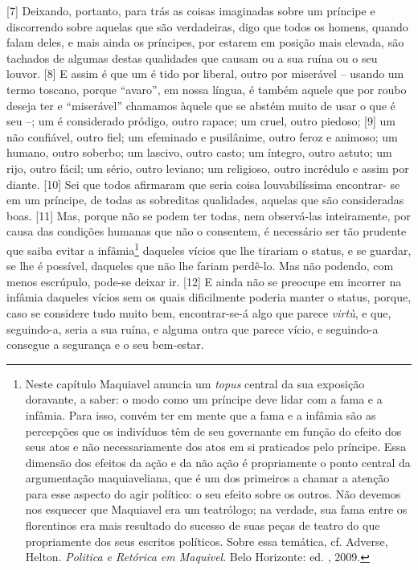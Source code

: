 {[}7{]} Deixando, portanto, para trás as coisas imaginadas sobre um
príncipe e discorrendo sobre aquelas que são verdadeiras, digo que todos
os homens, quando falam deles, e mais ainda os príncipes, por estarem em
posição mais elevada, são tachados de algumas destas qualidades que
causam ou a sua ruína ou o seu louvor. {[}8{]} E assim é que um é tido
por liberal, outro por miserável -- usando um termo toscano, porque
``avaro'', em nossa língua, é também aquele que por roubo deseja ter e
``miserável'' chamamos àquele que se abstém muito de usar o que é seu
--; um é considerado pródigo, outro rapace; um cruel, outro piedoso;
{[}9{]} um não confiável, outro fiel; um efeminado e pusilânime, outro
feroz e animoso; um humano, outro soberbo; um lascivo, outro casto; um
íntegro, outro astuto; um rijo, outro fácil; um sério, outro leviano; um
religioso, outro incrédulo e assim por diante. {[}10{]} Sei que todos
afirmaram que seria coisa louvabilíssima encontrar- se em um príncipe,
de todas as sobreditas qualidades, aquelas que são consideradas boas.
{[}11{]} Mas, porque não se podem ter todas, nem observá-las
inteiramente, por causa das condições humanas que não o consentem, é
necessário ser tão prudente que saiba evitar a infâmia\footnote{Neste
  capítulo Maquiavel anuncia um \emph{topus} central da sua exposição
  doravante, a saber: o modo como um príncipe deve lidar com a fama e a
  infâmia. Para isso, convém ter em mente que a fama e a infâmia são as
  percepções que os indivíduos têm de seu governante em função do efeito
  dos seus atos e não necessariamente dos atos em si praticados pelo
  príncipe. Essa dimensão dos efeitos da ação e da não ação é
  propriamente o ponto central da argumentação maquiaveliana, que é um
  dos primeiros a chamar a atenção para esse aspecto do agir político: o
  seu efeito sobre os outros. Não devemos nos esquecer que Maquiavel era
  um teatrólogo; na verdade, sua fama entre os florentinos era mais
  resultado do sucesso de suas peças de teatro do que propriamente dos
  seus escritos políticos. Sobre essa temática, cf. Adverse, Helton.
  \emph{Politica e Retórica em Maquivel}. Belo Horizonte: ed. ,
  2009.} daqueles vícios que lhe tirariam o status, e se guardar, se lhe
é possível, daqueles que não lhe fariam perdê-lo. Mas não podendo, com
menos escrúpulo, pode-se deixar ir. {[}12{]} E ainda não se preocupe em
incorrer na infâmia daqueles vícios sem os quais dificilmente poderia
manter o status, porque, caso se considere tudo muito bem,
encontrar-se-á algo que parece \emph{virtù}, e que, seguindo-a, seria a
sua ruína, e alguma outra que parece vício, e seguindo-a consegue a
segurança e o seu bem-estar.

